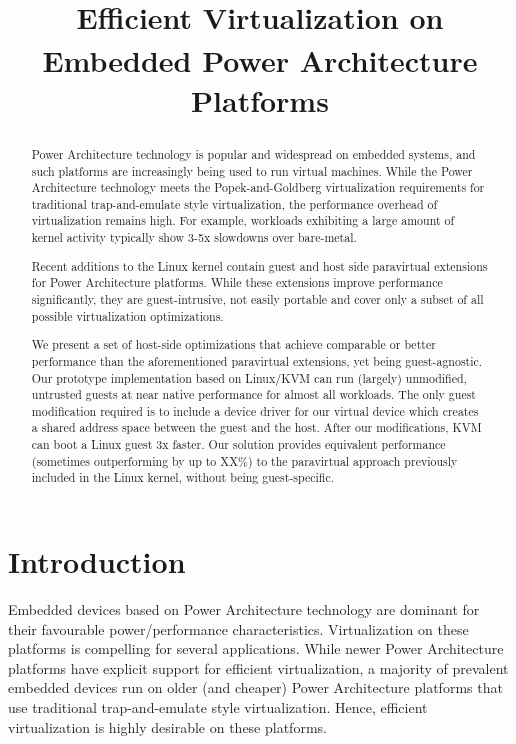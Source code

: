 \documentclass[10pt,twocolumn]{article}
\begin{document}
\title{Efficient Virtualization on Embedded Power Architecture\textsuperscript{\textregistered} Platforms}
\author{}
\date{}
\maketitle
\thispagestyle{empty}

\maketitle
\begin{abstract}
  Power Architecture\textsuperscript{\textregistered} technology is popular and widespread on embedded systems, and such
  platforms are
  increasingly
  being used to run virtual machines\cite{XXX}. While the Power Architecture technology meets the
  Popek-and-Goldberg virtualization requirements for traditional trap-and-emulate
  style virtualization, the performance overhead of virtualization remains high.
  For example, workloads exhibiting a large amount of kernel activity typically
  show 3-5x slowdowns over bare-metal.

  Recent additions to the Linux kernel contain guest and host side paravirtual
  extensions for Power Architecture platforms. While these extensions improve performance significantly, they
  are guest-intrusive, not easily portable and cover only a subset of all possible
  virtualization optimizations.

  We present a set of host-side optimizations that achieve comparable
  or better performance
  than the aforementioned paravirtual extensions, yet being guest-agnostic. Our
  prototype implementation based on Linux/KVM can run (largely) unmodified, untrusted
  guests at near native performance for almost all workloads. The only
  guest modification required is to include a device driver for our virtual
  device which creates a shared address space between the guest and the host.
  After our modifications, KVM can boot a Linux guest 3x faster. Our solution
  provides equivalent performance (sometimes outperforming by up to XX\%) to
  the paravirtual approach previously included in the Linux kernel, without
  being guest-specific.
\end{abstract}
\section{Introduction}
Embedded devices based on Power Architecture technology are dominant for their
favourable power/performance characteristics. Virtualization on these platforms is
compelling for several applications\cite{XXX}. While newer Power Architecture platforms
have explicit support for efficient virtualization\cite{XXX}, a majority of
prevalent embedded devices run on older (and cheaper) Power Architecture platforms that use
traditional trap-and-emulate style virtualization\cite{XXX}. Hence, efficient
virtualization is highly desirable on these platforms.
\end{document}
